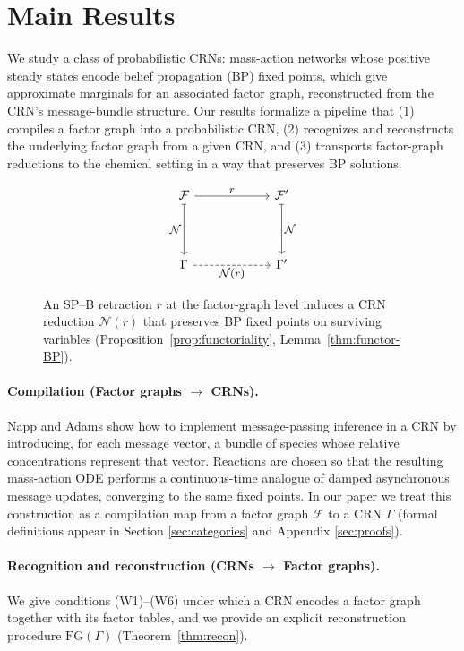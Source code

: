 \documentclass{article}
\theoremstyle{plain}
\theoremstyle{definition}
\theoremstyle{remark}
\newcommand{\<}{\langle}
\renewcommand{\>}{\rangle}
\begin{document}
\section{Main Results}
We study a class of probabilistic CRNs: mass-action networks whose positive steady states encode belief propagation (BP) fixed points, which give approximate marginals for an associated factor graph, reconstructed from the CRN’s message-bundle structure.
Our results formalize a pipeline that (1) compiles a factor graph into a probabilistic CRN,
(2) recognizes and reconstructs the underlying factor graph from a given CRN,
and (3) transports factor-graph reductions to the chemical setting in a way that preserves BP solutions.

\begin{figure}[h]
\centering
\[
\begin{tikzcd}[column sep=60pt, row sep=40pt,
               every label/.append style={font=\small}]
\mathcal{F}
  \arrow[r, "r"]
  \arrow[d, mapsto, "\mathcal{N}"']
& \mathcal{F}'
  \arrow[d, mapsto, "\mathcal{N}"]
\\
\Gamma
  \arrow[r, dashed, "\mathcal{N}(r)"']
& \Gamma'
\end{tikzcd}
\]
\caption{An SP--B retraction $r$ at the factor-graph level
induces a CRN reduction $\mathcal{N}(r)$ that preserves BP
fixed points on surviving variables
(Proposition~\ref{prop:functoriality},
Lemma~\ref{thm:functor-BP}).}
\label{fig:commutative}
\end{figure}

\paragraph{Compilation (Factor graphs $\to$ CRNs).}
Napp and Adams \cite{NIPS2013_e5e63da7} show how to implement message-passing inference in a CRN by introducing, for each message vector, a bundle of species whose relative concentrations represent that vector. Reactions are chosen so that the resulting mass-action ODE performs a continuous-time analogue of damped asynchronous message updates, converging to the same fixed points. In our paper we treat this construction as a compilation map from a factor graph $\mathcal F$  to a  CRN $\Gamma$ (formal definitions appear in Section \ref{sec:categories} and Appendix \ref{sec:proofs}).

\paragraph{Recognition and reconstruction (CRNs $\to$ Factor graphs).}
We give conditions (W1)--(W6) under which a CRN encodes a factor graph together with its factor tables,
and we provide an explicit reconstruction procedure $\mathrm{FG}(\Gamma)$ (Theorem~\ref{thm:recon}).
\end{document}
